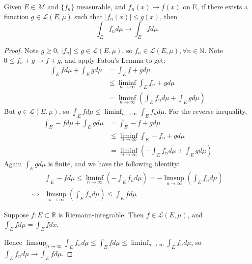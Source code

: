 \documentclass[11pt]{scrartcl}
\begin{document}
\begin{theorem} 
Given $E\in \mathcal{M}$ and $\{f_n\}$ measurable, and $ f_n(x)\rightarrow f(x)$ on E, if there exists a function $g\in \mathscr{L}(E,\mu)$ such that $|f_n(x)| \leq g(x)$, then $$ \int_E f_n d\mu \rightarrow \int_E f d\mu.$$
\end{theorem}
\begin{proof}
Note $g\geq 0$, $|f_n| \leq g \in \mathscr{L}(E,\mu)$, so $f_n \in \mathscr{L}(E,\mu), \forall n \in \mathbb{N}$. Note $0 \leq f_n + g \rightarrow f + g$, and apply Fatou's Lemma to get:
\begin{align*}
\int_E f d\mu + \int_E g d\mu & = \int_E f+g d\mu \tag{linearity}\\
& \leq \liminf_{n \rightarrow \infty} \int_E f_n + g d\mu \tag{Fatou}\\
& = \liminf_{n \rightarrow \infty}  ( \int_E f_n d\mu + \int_E g d\mu ) \tag{linearity}
\end{align*}
But $g \in \mathscr{L}(E,\mu)$, so $\int_E f d\mu  \leq \liminf_{n \rightarrow \infty} \int_E f_n d\mu$. For the reverse inequality, 
\begin{align*}
\int_E -f d\mu + \int_E g d\mu & = \int_E -f+g d\mu \tag{linearity}\\
& \leq \liminf_{n \rightarrow \infty} \int_E -f_n + g d\mu \tag{Fatou}\\
& = \liminf_{n \rightarrow \infty}  ( - \int_E f_n d\mu + \int_E g d\mu ) \tag{linearity}
\end{align*}
Again $ \int_E g d\mu $ is finite, and we have the following identity:
\begin{align*}
& \int_E -f d\mu \leq \liminf_{n \rightarrow \infty}  ( - \int_E f_n d\mu) = - \limsup_{n \rightarrow \infty}  (\int_E f_n d\mu)\\
\Leftrightarrow & \limsup_{n \rightarrow \infty}  (\int_E f_n d\mu) \leq \int_E f d\mu 
\end{align*}

\begin{theorem}
Suppose $f: E\subset \mathbb{R}$ is Riemann-integrable. Then $f \in \mathscr{L}(E,\mu)$, and $\int_E f d\mu = \int_E f dx$.
\end{theorem}

Hence $ \limsup_{n \rightarrow \infty}  \int_E f_n d\mu \leq \int_E f d\mu \leq \liminf_{n \rightarrow \infty} \int_E f_n d\mu$, so $\int_E f_n d\mu \rightarrow \int_E f d\mu$.
\end{proof}
\end{document}
